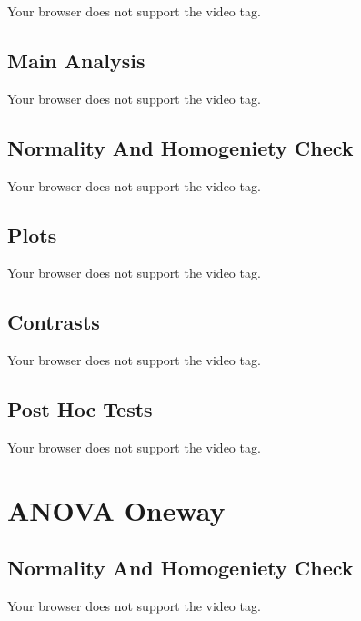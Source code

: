 \documentclass[
  letterpaper,
  DIV=11,
  numbers=noendperiod]{scrreprt}
\begin{document}
Your browser does not support the video tag.

\hypertarget{main-analysis-2}{%
\subsection{Main Analysis}\label{main-analysis-2}}

Your browser does not support the video tag.

\hypertarget{normality-and-homogeniety-check}{%
\subsection{Normality And Homogeniety
Check}\label{normality-and-homogeniety-check}}

Your browser does not support the video tag.

\hypertarget{plots-1}{%
\subsection{Plots}\label{plots-1}}

Your browser does not support the video tag.

\hypertarget{contrasts}{%
\subsection{Contrasts}\label{contrasts}}

Your browser does not support the video tag.

\hypertarget{post-hoc-tests}{%
\subsection{Post Hoc Tests}\label{post-hoc-tests}}

Your browser does not support the video tag.

\hypertarget{anova-oneway}{%
\section{ANOVA Oneway}\label{anova-oneway}}

\hypertarget{normality-and-homogeniety-check-1}{%
\subsection{Normality And Homogeniety
Check}\label{normality-and-homogeniety-check-1}}

Your browser does not support the video tag.
\end{document}
